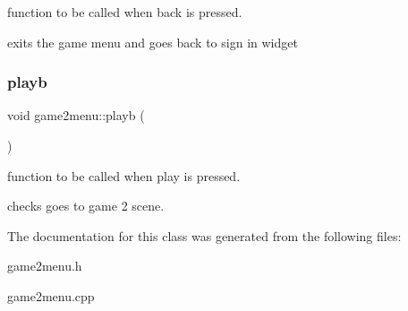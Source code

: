 function to be called when back is pressed. 

exits the game menu and goes back to sign in widget \mbox{\label{classgame2menu_a329e5585c0d5c6af4c4f4011efa6878f}} 
\subsubsection{\texorpdfstring{playb}{playb}}
{\footnotesize\ttfamily void game2menu\+::playb (\begin{DoxyParamCaption}{ }\end{DoxyParamCaption})\hspace{0.3cm}{\ttfamily [slot]}}



function to be called when play is pressed. 

checks goes to game 2 scene. 

The documentation for this class was generated from the following files\+:\begin{DoxyCompactItemize}
\item 
game2menu.\+h\item 
game2menu.\+cpp\end{DoxyCompactItemize}
